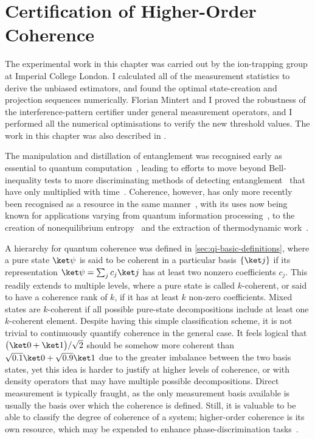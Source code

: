 \chapter{Certification of Higher-Order Coherence}\label{sec:coherence}

\begin{coauthorship}
The experimental work in this chapter was carried out by the ion-trapping group at Imperial College London.
I calculated all of the measurement statistics to derive the unbiased estimators, and found the optimal state-creation and projection sequences numerically.
Florian Mintert and I proved the robustness of the interference-pattern certifier under general measurement operators, and I performed all the numerical optimisations to verify the new threshold values.
The work in this chapter was also described in .
\end{coauthorship}

The manipulation and distillation of entanglement was recognised early as essential to quantum computation~\cite{Bennett1996}, leading to efforts to move beyond Bell-inequality tests to more discriminating methods of detecting entanglement~\cite{Peres1996,Horodecki1996} that have only multiplied with time~\cite{Horodecki2009,Horodecki2021}.
Coherence, however, has only more recently been recognised as a resource in the same manner~\cite{Levi2014,Baumgratz2014,Streltsov2017}, with its uses now being known for applications varying from quantum information processing~\cite{Hillery2016,Shi2017}, to the creation of nonequilibrium entropy~\cite{Santos2019} and the extraction of thermodynamic work~\cite{Korzekwa2016}.

A hierarchy for quantum coherence was defined in \cref{sec:qi-basic-definitions}, where a pure state $\ket\psi$ is said to be coherent in a particular basis $\{\ket j\}$ if its representation $\ket\psi = \sum_j c_j \ket j$ has at least two nonzero coefficients $c_j$.
This readily extends to multiple levels, where a pure state is called $k$-coherent, or said to have a coherence rank of $k$, if it has at least $k$ non-zero coefficients.
Mixed states are $k$-coherent if all possible pure-state decompositions include at least one $k$-coherent element.
Despite having this simple classification scheme, it is not trivial to continuously quantify coherence in the general case.
It feels logical that $\bigl(\ket0 + \ket1\bigr)/\sqrt2$ should be somehow more coherent than $\sqrt{0.1}\ket0 + \sqrt{0.9}\ket1$ due to the greater imbalance between the two basis states, yet this idea is harder to justify at higher levels of coherence, or with density operators that may have multiple possible decompositions.
Direct measurement is typically fraught, as the only measurement basis available is usually the basis over which the coherence is defined.
Still, it is valuable to be able to classify the degree of coherence of a system; higher-order coherence is its own resource, which may be expended to enhance phase-discrimination tasks~\cite{Ringbauer2018,Castellini2019}.

